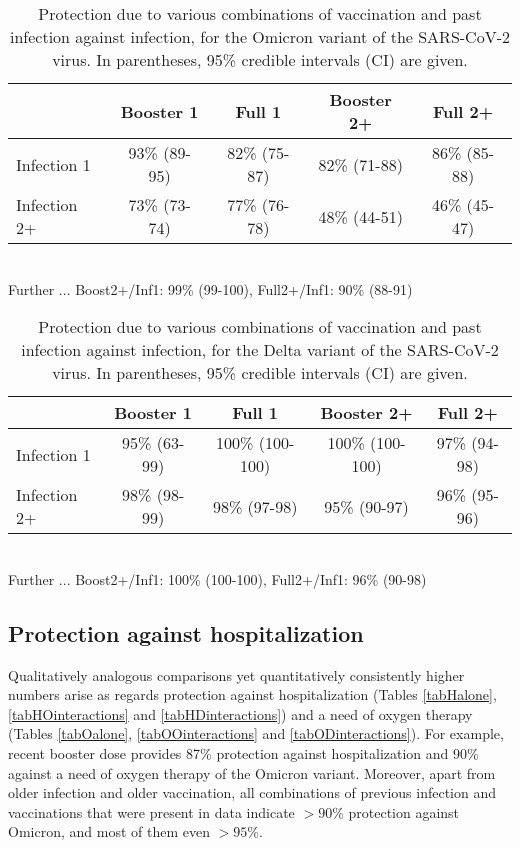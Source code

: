 \documentclass[preprint,12pt,authoryear]{elsarticle}
\begin{document}
\begin{table}[!h]
\caption{Protection due to various combinations of vaccination and past infection against infection, for the Omicron variant of the SARS-CoV-2 virus. In parentheses, 95\% credible intervals (CI) are given. \\[1ex]}
\label{tabIOinteractions}
\centering
\begin{tabular}{lcccc}
\hline
 & Booster 1 & Full 1 & Booster 2+ & Full 2+ \\
\hline
Infection 1 & 93\% (89-95) & 82\% (75-87) & 82\% (71-88) & 86\% (85-88) \\
Infection 2+ & 73\% (73-74) & 77\% (76-78) & 48\% (44-51) & 46\% (45-47) \\
\hline
\end{tabular} \\[1ex]
Further ... Boost2+/Inf1: 99\% (99-100), Full2+/Inf1: 90\% (88-91)
\end{table}

\begin{table}[!h]
\caption{Protection due to various combinations of vaccination and past infection against infection, for the Delta variant of the SARS-CoV-2 virus. In parentheses, 95\% credible intervals (CI) are given. \\[1ex]}
\label{tabIDinteractions}
\centering
\begin{tabular}{lcccc}
\hline
 & Booster 1 & Full 1 & Booster 2+ & Full 2+ \\
\hline
Infection 1 & 95\% (63-99) & 100\% (100-100) & 100\% (100-100) & 97\% (94-98) \\
Infection 2+ & 98\% (98-99) & 98\% (97-98) & 95\% (90-97) & 96\% (95-96) \\
\hline
\end{tabular} \\[1ex]
Further ... Boost2+/Inf1: 100\% (100-100), Full2+/Inf1: 96\% (90-98)
\end{table}

\subsection*{Protection against hospitalization}

Qualitatively analogous comparisons yet quantitatively consistently higher numbers arise as regards protection against hospitalization (Tables \ref{tabHalone}, \ref{tabHOinteractions} and \ref{tabHDinteractions}) and a need of oxygen therapy (Tables \ref{tabOalone}, \ref{tabOOinteractions} and \ref{tabODinteractions}). %
For example, recent booster dose provides 87\% protection against hospitalization and 90\% against a need of oxygen therapy of the Omicron variant. Moreover, apart from older infection and older vaccination, all combinations of previous infection and vaccinations that were present in data indicate $>90\%$ protection against Omicron, and most of them even $>95\%$. 
\end{document}
